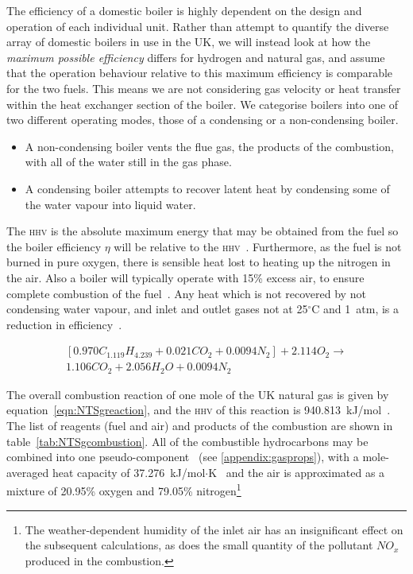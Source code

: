 \documentclass[5p]{elsarticle} %
\begin{document}
The efficiency of a domestic boiler is highly dependent on the design and operation of each individual unit. 
Rather than attempt to quantify the diverse array of domestic boilers  in use in the UK, we will instead look at how the \emph{maximum possible efficiency} differs for hydrogen and natural gas, and assume that the operation behaviour relative to this maximum efficiency is comparable for the two fuels.
This means we are not considering gas velocity or heat transfer within the heat exchanger section of the boiler.
We 
categorise boilers into one of two different operating modes, those of a condensing or a non-condensing boiler.

\begin{itemize}
    \item A non-condensing boiler vents the flue gas, the products of the combustion, with all of the water still in the gas phase.
    \item A condensing boiler attempts to recover latent heat by condensing some of the water vapour into liquid water. 
\end{itemize}

The \textsc{hhv} is the absolute maximum energy that may be obtained from the fuel
so the boiler efficiency $\eta$ will be relative to the \textsc{hhv}~\citep{saty2018}.
Furthermore, as the fuel is not burned in pure oxygen, there is sensible heat lost to heating up the nitrogen in the air. 
Also a  boiler will typically operate with 15\% excess air, to ensure complete combustion of the fuel~\citep{CleaverBooks2016}.
Any heat which is not recovered by not condensing water vapour, and inlet and outlet gases not at 25$^\circ$C and 1~atm, is a reduction in efficiency~\citep{saty2018}.

\begin{multline}
    \label{eqn:NTSgreaction}
    [0.970 C_{1.119} H_{4.239} + 0.021 C O_2 + 0.0094 N_2] + 2.114 O_2 \longrightarrow \\
    1.106 C O_2 + 2.056 H_2 O + 0.0094 N_2
\end{multline}

The overall combustion reaction of one mole of the UK natural gas is given by equation~\eqref{eqn:NTSgreaction}, and the \textsc{hhv} of this reaction is 940.813~kJ/mol~\citep{nist_delta_H}.
The list of reagents (fuel and air) and products of the combustion are shown in table~\ref{tab:NTSgcombustion}.
All of the combustible hydrocarbons may be combined into one pseudo-component~\citep{coolprop} (see \ref{appendix:gasprops}), with a mole-averaged heat capacity of 37.276~kJ/mol$\cdot$K~\citep{Huber2022} and the air is approximated as a mixture of 20.95\% oxygen and 79.05\% nitrogen\footnote{The weather-dependent humidity of the inlet air has an insignificant effect on the subsequent calculations, as does the small quantity of the pollutant $NO_{x}$ produced in the combustion.}
\end{document}
